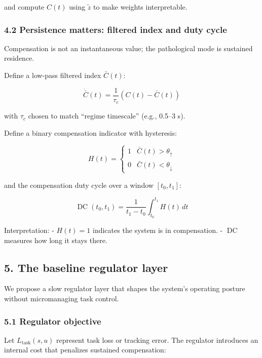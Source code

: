 \documentclass[11pt]{article}
\begin{document}
and compute \(C(t)\) using \(\tilde z\) to make weights interpretable.

\hypertarget{persistence-matters-filtered-index-and-duty-cycle}{%
\subsubsection{4.2 Persistence matters: filtered index and duty cycle}\label{persistence-matters-filtered-index-and-duty-cycle}}

Compensation is not an instantaneous value; the pathological mode is sustained residence.

Define a low-pass filtered index \(\bar C(t)\):

\[
\dot{\bar C}(t) = \frac{1}{\tau_c}(C(t) - \bar C(t))
\]

with \(\tau_c\) chosen to match ``regime timescale'' (e.g., 0.5--3 s).

Define a binary compensation indicator with hysteresis:

\[
H(t) = \begin{cases}
1 & \bar C(t) > \theta_{\uparrow} \\
0 & \bar C(t) < \theta_{\downarrow}
\end{cases}
\]

and the compensation duty cycle over a window \([t_0, t_1]\):

\[
\operatorname{DC}(t_0,t_1) = \frac{1}{t_1-t_0}\int_{t_0}^{t_1} H(t)\,dt
\]

Interpretation: - \(H(t)=1\) indicates the system is in compensation. - \(\operatorname{DC}\) measures how long it stays there.

\hypertarget{the-baseline-regulator-layer}{%
\subsection{5. The baseline regulator layer}\label{the-baseline-regulator-layer}}

We propose a slow regulator layer that shapes the system's operating posture without micromanaging task control.

\hypertarget{regulator-objective}{%
\subsubsection{5.1 Regulator objective}\label{regulator-objective}}

Let \(L_{\text{task}}(s,u)\) represent task loss or tracking error. The regulator introduces an internal cost that penalizes sustained compensation:
\end{document}
